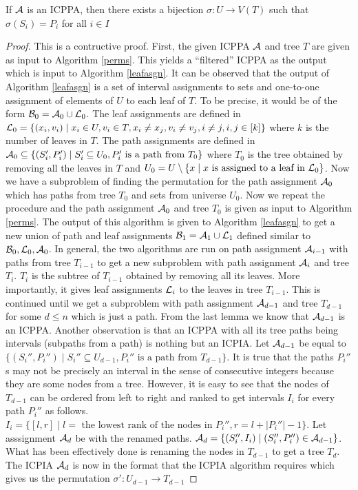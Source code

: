 \begin{theorem}
  \label{th:perm}
  If ${\cal A}$ is an ICPPA, then there exists a bijection $\sigma : U
  \rightarrow V(T)$ such that $\sigma(S_i) = P_i$ for all $i \in I$
\end{theorem}
\begin{proof}
  This is a contructive proof. First, the given ICPPA ${\cal A}$ and tree
  $T$ are given as input to Algorithm \ref{perms}. This yields a
  ``filtered'' ICPPA as the output which is input to Algorithm
  \ref{leafasgn}.  It can be observed that the output of Algorithm
  \ref{leafasgn} is a set of interval assignments to sets and
  one-to-one assignment of elements of $U$ to each leaf of $T$. To be
  precise, it would be of the form ${\cal B}_0 = {\cal A}_0 \cup {\cal L}_0$. The
  leaf assignments are defined in ${\cal L}_0 = \{ (x_i,v_i) \mid x_i \in
  U, v_i \in T, x_i \ne x_j, v_i \ne v_j, i \ne j, i,j \in [k] \}$
  where $k$ is the number of leaves in $T$. The path assignments are
  defined in ${\cal A}_0 \subseteq \{(S_i',P_i') \mid S_i' \subseteq U_0,
  P_i' \text{ is a path from } T_0\}$ where $T_0$ is the tree obtained
  by removing all the leaves in $T$ and $U_0 = U \setminus \{ x \mid x
  \text{ is assigned to a leaf in }{\cal L}_0 \}$. Now we have a subproblem
  of finding the permutation for the path assignment ${\cal A}_0$ which has
  paths from tree $T_0$ and sets from universe $U_0$. Now we repeat
  the procedure and the path assignment ${\cal A}_0$ and tree $T_0$ is
  given as input to Algorithm \ref{perms}. The output of this
  algorithm is given to Algorithm \ref{leafasgn} to get a new union of
  path and leaf assignments ${\cal B}_1 = {\cal A}_1 \cup {\cal L}_1$ defined similar
  to ${\cal B}_0, {\cal L}_0, {\cal A}_0$. In general, the two algorithms are run on
  path assignment ${\cal A}_{i-1}$ with paths from tree $T_{i-1}$ to get a
  new subproblem with path assignment ${\cal A}_i$ and tree $T_{i}$. $T_i$
  is the subtree of $T_{i-1}$ obtained by removing all its
  leaves. More importantly, it gives leaf assignments ${\cal L}_{i}$ to the
  leaves in tree $T_{i-1}$. This is continued until we get a
  subproblem with path assignment ${\cal A}_{d-1}$ and tree $T_{d-1}$ for
  some $d \le n$ which is just a path. From the last lemma we know
  that ${\cal A}_{d-1}$ is an ICPPA. Another observation is that an ICPPA
  with all its tree paths being intervals (subpaths from a path) is
  nothing but an ICPIA\cite{nsnrs09}.  Let ${\cal A}_{d-1}$ be equal to
  $\{(S_i'',P_i'') \mid S_i'' \subseteq U_{d-1}, P_i'' \text{ is a
    path from } T_{d-1} \}$. It is true that the paths $P_i''$s may
  not be precisely an interval in the sense of consecutive integers
  because they are some nodes from a tree. However, it is easy to see
  that the nodes of $T_{d-1}$ can be ordered from left to right and
  ranked to get intervals $I_i$ for every path $P_i''$ as
  follows. $I_i = \{[l,r] \mid l = \text{ the lowest rank of the nodes
    in }P_i'', r = l+|P_i''|-1 \}$. Let asssignment ${\cal A}_d$ be with
  the renamed paths. ${\cal A}_d = \{ (S_i'', I_i) \mid (S_i'', P_i'') \in
  {\cal A}_{d-1} \}$. What has been effectively done is renaming the nodes
  in $T_{d-1}$ to get a tree $T_d$.  The ICPIA ${\cal A}_d$ is now in the
  format that the ICPIA algorithm requires which gives us the
  permutation $\sigma' : U_{d-1} \rightarrow T_{d-1}$


\end{proof}
